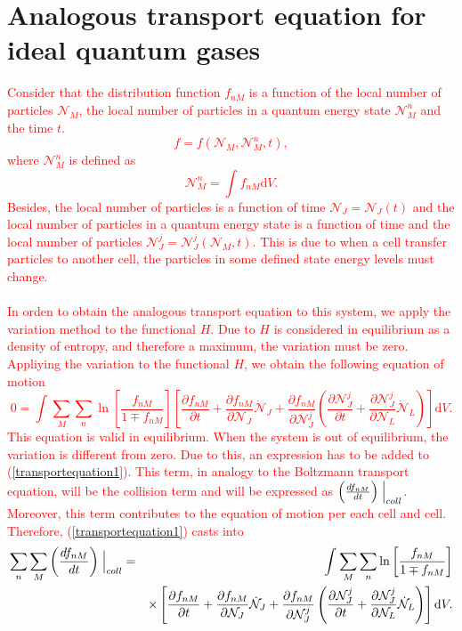 \documentclass{article}
\begin{document}
\section{Analogous transport equation for ideal quantum gases}
\textcolor{red}{Consider that the distribution function $f_{nM}$ is a function of the local number of particles $\mathcal{N}_M$, the local number of particles in a quantum energy state $\mathcal{N}_{M}^{n}$ and the time $t$.
\begin{equation}
    f=f(\mathcal{N}_M,\mathcal{N}_M^{n},t),
\end{equation}
where $\mathcal{N}_{M}^{n}$ is defined as
\begin{equation}
    \mathcal{N}_{M}^{n}=\int f_{nM}\mathrm{d}V.
\end{equation}
Besides, the local number of particles is a function of time $\mathcal{N}_J=\mathcal{N}_J(t)$ and the local number of particles in a quantum energy state is a function of time and the local number of particles $\mathcal{N}_J^{j}=\mathcal{N}_J^{j}(\mathcal{N}_M,t)$. This is due to when a cell transfer particles to another cell, the particles in some defined state energy levels must change.\\
\\
In orden to obtain the analogous transport equation to this system, we apply the variation method to the functional $H$. Due to $H$ is considered in equilibrium as a density of entropy, and therefore a maximum, the variation must be zero.\\
Appliying the variation to the functional $H$, we obtain the following equation of motion
\begin{equation}
    0=\int_{}^{}\sum_M \sum_n \ln \left[ \frac{f_{nM}}{1\mp f_{nM}} \right] \left[ \frac{\partial f_{nM}}{\partial t}+\frac{\partial f_{nM}}{\partial \mathcal{N}_J}\dot{\mathcal{N}}_J+\frac{\partial f_{nM}}{\partial \mathcal{N}_J^{j}}\left( \frac{\partial \mathcal{N}_J^{j}}{\partial t}+\frac{\partial \mathcal{N}_J^{j}}{\partial \mathcal{N}_L}\dot{\mathcal{N}}_L \right) \right]\mathrm{d}V. \label{transportequation1}
\end{equation}
This equation is valid in equilibrium. When the system is out of equilibrium, the variation is different from zero. Due to this, an expression has to be added to (\ref{transportequation1}). This term, in analogy to the Boltzmann transport equation, will be the collision term and will be expressed as $\left( \frac{df_{nM}}{dt} \right)\Bigm|_{coll}$. Moreover, this term contributes to the equation of motion per each cell and cell. Therefore, (\ref{transportequation1}) casts into
\begin{eqnarray}
    \sum_n \sum_M\left( \frac{df_{nM}}{dt} \right)\Bigm|_{coll}&=&\int_{}^{}\sum_M \sum_n \ln \left[ \frac{f_{nM}}{1\mp f_{nM}} \right] \nonumber \\
    &&\times \left[ \frac{\partial f_{nM}}{\partial t}+\frac{\partial f_{nM}}{\partial \mathcal{N}_J}\dot{\mathcal{N}}_J+\frac{\partial f_{nM}}{\partial \mathcal{N}_J^{j}}\left( \frac{\partial \mathcal{N}_J^{j}}{\partial t}+\frac{\partial \mathcal{N}_J^{j}}{\partial \mathcal{N}_L}\dot{\mathcal{N}}_L \right) \right]\mathrm{d}V.  \nonumber \\ \label{transportequation2}
\end{eqnarray}}
\end{document}
